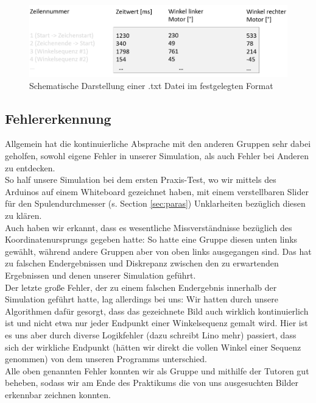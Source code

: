 \begin{figure}[ht]\centering
\includegraphics[width=\linewidth]{images/dateiformat.png}
\caption{Schematische Darstellung einer .txt Datei im festgelegten Format}
\label{fig:dateiformat}
\end{figure}

\subsection{Fehlererkennung}
Allgemein hat die kontinuierliche Absprache mit den anderen Gruppen sehr dabei geholfen, sowohl eigene Fehler in unserer Simulation, als auch Fehler bei Anderen zu entdecken. \\
So half unsere Simulation bei dem ersten \glqq{}Praxis-Test\grqq{}, wo wir mittels des Arduinos auf einem Whiteboard gezeichnet haben, mit einem verstellbaren Slider für den Spulendurchmesser (s. Section \ref{sec:paras}) Unklarheiten bezüglich diesen zu klären.\\
Auch haben wir erkannt, dass es wesentliche Missverständnisse bezüglich des Koordinatenursprungs gegeben hatte: So hatte eine Gruppe diesen unten links gewählt, während andere Gruppen aber von oben links ausgegangen sind. Das hat zu falschen Endergebnissen und Diskrepanz zwischen den zu erwartenden Ergebnissen und denen unserer Simulation geführt. \\
Der letzte große Fehler, der zu  einem falschen Endergebnis innerhalb der Simulation geführt hatte, lag allerdings bei uns: Wir hatten durch unsere Algorithmen dafür gesorgt, dass das gezeichnete Bild auch wirklich kontinuierlich ist und nicht etwa nur jeder Endpunkt einer Winkelsequenz gemalt wird. Hier ist es uns aber durch diverse Logikfehler (dazu schreibt Lino mehr) passiert, dass sich der wirkliche Endpunkt (hätten wir direkt die vollen Winkel einer Sequenz genommen) von dem unseren Programms unterschied. \\
Alle oben genannten Fehler konnten wir als Gruppe und mithilfe der Tutoren gut beheben, sodass wir am Ende des Praktikums die von uns ausgesuchten Bilder erkennbar zeichnen konnten. \\